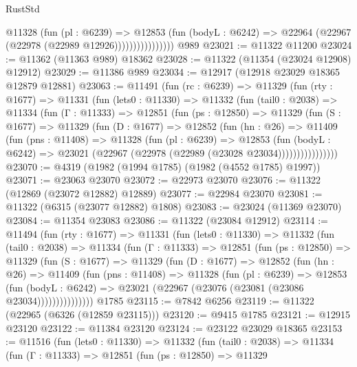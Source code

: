 \begin{lexlean}{RustStd}
\begin{coremodule}
                        @11328
                          (fun (pl : @6239) =>
                          @12853
                            (fun (bodyL : @6242) =>
                            @22964 (@22967 (@22978 (@22989 @12926))))))))))))))))
    @989
@23021 := @11322 @11200
@23024 := @11362 (@11363 @989) @18362
@23028 := @11322 (@11354 (@23024 @12908) @12912)
@23029 := @11386 @989
@23034 := @12917 (@12918 @23029 @18365 @12879 @12881)
@23063 := @11491
    (fun (rc : @6239) =>
    @11329
      (fun (rty : @1677) =>
      @11331
        (fun (lets0 : @11330) =>
        @11332
          (fun (tail0 : @2038) =>
          @11334
            (fun (Γ : @11333) =>
            @12851
              (fun (ps : @12850) =>
              @11329
                (fun (S : @1677) =>
                @11329
                  (fun (D : @1677) =>
                  @12852
                    (fun (hn : @26) =>
                    @11409
                      (fun (pns : @11408) =>
                      @11328
                        (fun (pl : @6239) =>
                        @12853
                          (fun (bodyL : @6242) =>
                          @23021 (@22967 (@22978 (@22989 (@23028 @23034))))))))))))))))
@23070 := @4319 (@1982 (@1994 @1785) (@1982 (@4552 @1785) @1997))
@23071 := @23063 @23070
@23072 := @22973 @23070
@23076 := @11322 (@12869 (@23072 @12882) @12889)
@23077 := @22984 @23070
@23081 := @11322 (@6315 (@23077 @12882) @1808)
@23083 := @23024 (@11369 @23070)
@23084 := @11354 @23083
@23086 := @11322 (@23084 @12912)
@23114 := @11494
    (fun (rty : @1677) =>
    @11331
      (fun (lets0 : @11330) =>
      @11332
        (fun (tail0 : @2038) =>
        @11334
          (fun (Γ : @11333) =>
          @12851
            (fun (ps : @12850) =>
            @11329
              (fun (S : @1677) =>
              @11329
                (fun (D : @1677) =>
                @12852
                  (fun (hn : @26) =>
                  @11409
                    (fun (pns : @11408) =>
                    @11328
                      (fun (pl : @6239) =>
                      @12853
                        (fun (bodyL : @6242) =>
                        @23021 (@22967 (@23076 (@23081 (@23086 @23034)))))))))))))))
    @1785
@23115 := @7842 @6256
@23119 := @11322 (@22965 (@6326 (@12859 @23115)))
@23120 := @9415 @1785
@23121 := @12915 @23120
@23122 := @11384 @23120
@23124 := @23122 @23029 @18365
@23153 := @11516
    (fun (lets0 : @11330) =>
    @11332
      (fun (tail0 : @2038) =>
      @11334
        (fun (Γ : @11333) =>
        @12851
          (fun (ps : @12850) =>
          @11329

\end{coremodule}
\end{lexlean}
